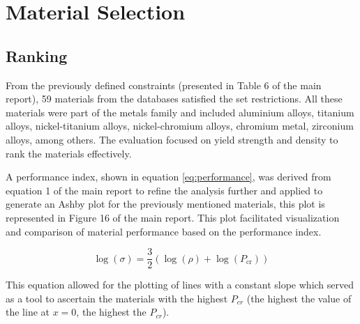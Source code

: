 \renewcommand{\thesection}{S5}
\section{Material Selection}
\setcounter{subsection}{4}
\subsection{Ranking}
    From the previously defined constraints (presented in Table 6 of the main report), 59 materials from the databases satisfied the set restrictions. All these materials were part of the metals family and included aluminium alloys, titanium alloys, nickel-titanium alloys, nickel-chromium alloys, chromium metal, zirconium alloys, among others. The evaluation focused on yield strength and density to rank the materials effectively.
    
    A performance index, shown in equation \ref{eq:performance}, was derived from equation 1 of the main report to refine the analysis further and applied to generate an Ashby plot for the previously mentioned materials, this plot is represented in Figure 16 of the main report. This plot facilitated visualization and comparison of material performance based on the performance index.

    \renewcommand{\theequation}{S2}
    \begin{equation}
        \log(\sigma) = \frac{3}{2}\left(\log(\rho) + \log(P_{\text{cr}})\right)
        \label{eq:performance}
    \end{equation}

    This equation allowed for the plotting of lines with a constant slope which served as a tool to ascertain the materials with the highest $P_{cr}$ (the highest the value of the line at $x=0$, the highest the $P_{cr}$).